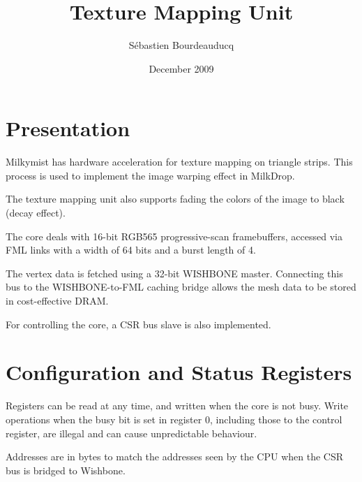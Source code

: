 \documentclass[a4paper,11pt]{article}
\title{Texture Mapping Unit}
\author{S\'ebastien Bourdeauducq}
\date{December 2009}
\begin{document}
\setlength{\parindent}{0pt}
\setlength{\parskip}{5pt}
\maketitle{}

\section{Presentation}
Milkymist has hardware acceleration for texture mapping on triangle strips. This process is used to implement the image warping effect in MilkDrop.

The texture mapping unit also supports fading the colors of the image to black (decay effect).

The core deals with 16-bit RGB565 progressive-scan framebuffers, accessed via FML links with a width of 64 bits and a burst length of 4.

The vertex data is fetched using a 32-bit WISHBONE master. Connecting this bus to the WISHBONE-to-FML caching bridge allows the mesh data to be stored in cost-effective DRAM.

For controlling the core, a CSR bus slave is also implemented.

\section{Configuration and Status Registers}
Registers can be read at any time, and written when the core is not busy. Write operations when the busy bit is set in register 0, including those to the control register, are illegal and can cause unpredictable behaviour.

Addresses are in bytes to match the addresses seen by the CPU when the CSR bus is bridged to Wishbone.
\end{document}
